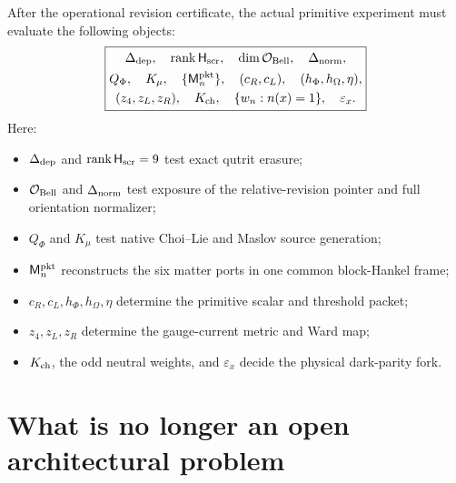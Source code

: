 \documentclass[11pt,oneside,openany]{book}
\numberwithin{equation}{chapter}
\theoremstyle{definition}
\theoremstyle{remark}
\newcommand{\rank}{\operatorname{rank}}
\begin{document}
After the operational revision certificate, the actual primitive experiment
must evaluate the following objects:
\[
 \boxed{
 \begin{gathered}
 \Delta_{\rm dep},\quad
 \rank\mathsf H_{\rm scr},\quad
 \dim\mathcal O_{\rm Bell},\quad
 \Delta_{\rm norm},\\
 Q_\Phi,\quad
 K_\mu,\quad
 \{\mathsf M_n^{\rm pkt}\},\quad
 (c_R,c_L),\quad
 (h_\Phi,h_\Omega,\eta),\\
 (z_4,z_L,z_R),\quad
 K_{\rm ch},\quad
 \{w_n:n(x)=1\},\quad
 \varepsilon_x.
 \end{gathered}}
\]
Here:
\begin{itemize}[leftmargin=2.2em]
\item \(\Delta_{\rm dep}\) and \(\rank\mathsf H_{\rm scr}=9\) test exact
      qutrit erasure;
\item \(\mathcal O_{\rm Bell}\) and \(\Delta_{\rm norm}\) test exposure of
      the relative-revision pointer and full orientation normalizer;
\item \(Q_\Phi\) and \(K_\mu\) test native Choi--Lie and Maslov source
      generation;
\item \(\mathsf M_n^{\rm pkt}\) reconstructs the six matter ports in one
      common block-Hankel frame;
\item \(c_R,c_L,h_\Phi,h_\Omega,\eta\) determine the primitive scalar and
      threshold packet;
\item \(z_4,z_L,z_R\) determine the gauge-current metric and Ward map;
\item \(K_{\rm ch}\), the odd neutral weights, and \(\varepsilon_x\) decide
      the physical dark-parity fork.
\end{itemize}

\section{What is no longer an open architectural problem}
\end{document}
